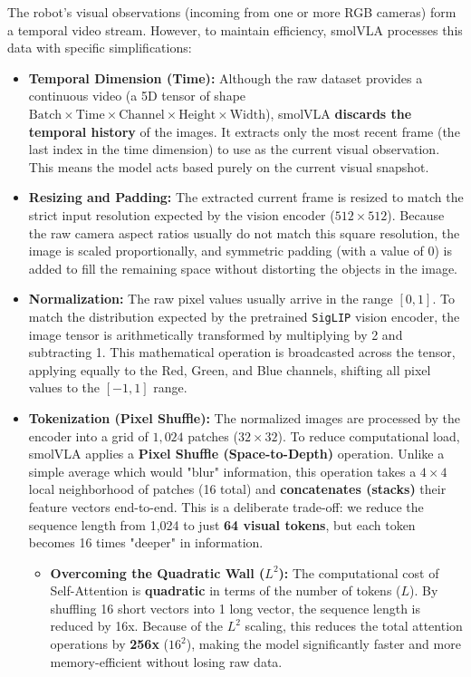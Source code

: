 \documentclass[11pt,a4paper]{article}
\begin{document}
The robot's visual observations (incoming from one or more RGB cameras) form a temporal video stream. However, to maintain efficiency, smolVLA processes this data with specific simplifications:
\begin{itemize}
    \item \textbf{Temporal Dimension (Time):} Although the raw dataset provides a continuous video (a 5D tensor of shape $\text{Batch} \times \text{Time} \times \text{Channel} \times \text{Height} \times \text{Width}$), smolVLA \textbf{discards the temporal history} of the images. It extracts only the most recent frame (the last index in the time dimension) to use as the current visual observation. This means the model acts based purely on the current visual snapshot.
    \item \textbf{Resizing and Padding:} The extracted current frame is resized to match the strict input resolution expected by the vision encoder ($512 \times 512$). Because the raw camera aspect ratios usually do not match this square resolution, the image is scaled proportionally, and symmetric padding (with a value of $0$) is added to fill the remaining space without distorting the objects in the image.
    \item \textbf{Normalization:} The raw pixel values usually arrive in the range $[0, 1]$. To match the distribution expected by the pretrained \texttt{SigLIP} vision encoder, the image tensor is arithmetically transformed by multiplying by 2 and subtracting 1. This mathematical operation is broadcasted across the tensor, applying equally to the Red, Green, and Blue channels, shifting all pixel values to the $[-1, 1]$ range.
    \item \textbf{Tokenization (Pixel Shuffle):} The normalized images are processed by the encoder into a grid of $1,024$ patches ($32 \times 32$). To reduce computational load, smolVLA applies a \textbf{Pixel Shuffle (Space-to-Depth)} operation. Unlike a simple average which would "blur" information, this operation takes a $4 \times 4$ local neighborhood of patches (16 total) and \textbf{concatenates (stacks)} their feature vectors end-to-end. This is a deliberate trade-off: we reduce the sequence length from 1,024 to just \textbf{64 visual tokens}, but each token becomes 16 times "deeper" in information.
    \begin{itemize}
        \item \textbf{Overcoming the Quadratic Wall ($L^2$):} The computational cost of Self-Attention is \textbf{quadratic} in terms of the number of tokens ($L$). By shuffling 16 short vectors into 1 long vector, the sequence length is reduced by 16x. Because of the $L^2$ scaling, this reduces the total attention operations by \textbf{256x} ($16^2$), making the model significantly faster and more memory-efficient without losing raw data.

\end{itemize}
\end{itemize}
\end{document}
